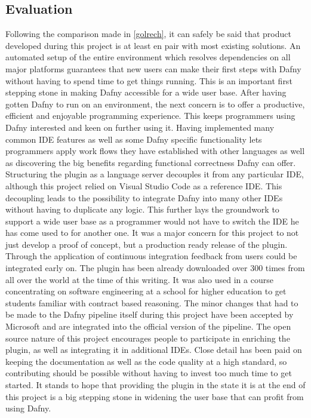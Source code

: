 \subsection{Evaluation}
Following the comparison made in \ref{golrech}, it can safely be said that product developed during this project is at least en pair with most existing solutions. An automated setup of the entire environment which resolves dependencies on all major platforms guarantees that new users can make their first steps with Dafny without having to spend time to get things running. This is an important first stepping stone in making Dafny accessible for a wide user base. \newline
After having gotten Dafny to run on an environment, the next concern is to offer a productive, efficient and enjoyable programming experience. This keeps programmers using Dafny interested and keen on further using it. Having implemented many common IDE features as well as some Dafny specific functionality lets programmers apply work flows they have established with other languages as well as discovering the big benefits regarding functional correctness Dafny can offer. \newline
Structuring the plugin as a language server decouples it from any particular IDE, although this project relied on Visual Studio Code as a reference IDE. This decoupling leads to the possibility to integrate Dafny into many other IDEs without having to duplicate any logic. This further lays the groundwork to support a wide user base as a programmer would not have to switch the IDE he has come used to for another one. \newline
It was a major concern for this project to not just develop a proof of concept, but a production ready release of the plugin. Through the application of continuous integration feedback from users could be integrated early on. The plugin has been already downloaded over 300 times from all over the world at the time of this writing. It was also used in a course concentrating on software engineering at a school for higher education to get students familiar with contract based reasoning. The minor changes that had to be made to the Dafny pipeline itself during this project have been accepted by Microsoft and are integrated into the official version of the pipeline. \newline
The open source nature of this project encourages people to participate in enriching the plugin, as well as integrating it in additional IDEs. Close detail has been paid on keeping the documentation as well as the code quality at a high standard, so contributing should be possible without having to invest too much time to get started. It stands to hope that providing the plugin in the state it is at the end of this project is a big stepping stone in widening the user base that can profit from using Dafny. 